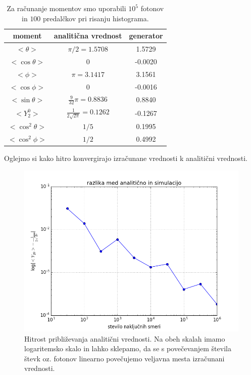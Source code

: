 \documentclass[slovene,11pt,a4paper]{article}
\numberwithin{equation}{section} %
\numberwithin{figure}{section} %
\numberwithin{table}{section} %
\begin{document}
\begin{table}[h]
\begin{center}
\begin{tabular}{|c|c|c|}
\hline
moment & analitična vrednost & generator \\ \hline
$<\theta>$ & $\pi /2=1.5708$ & 1.5729 \\ \hline
$<\cos\theta>$ & $0$ & -0.0020 \\ \hline
$<\phi>$ & $\pi=3.1417$ & 3.1561 \\ \hline
$<\cos \phi>$ & $0$ & -0.0016 \\ \hline
$<\sin \theta>$ & $\frac{9}{32} \pi=0.8836$ & 0.8840 \\ \hline
$<Y_2^0>$ & $\frac{1}{2\sqrt{2 \pi}}=0.1262$ & -0.1267 \\ \hline
$<\cos^2 \theta>$ & $1/5$ & 0.1995 \\ \hline
$<\cos^2 \phi>$ & $1/2$ & 0.4992 \\ \hline
\end{tabular}
\label{}
\caption{Za računanje momentov smo uporabili $10^{5}$ fotonov in $100$ predalčkov pri risanju histograma.}
\end{center}
\end{table}
Oglejmo si kako hitro konvergirajo izračunane vrednosti k analitični vrednosti.

\begin{figure}[h]
\begin{center}
\includegraphics[scale=0.4]{slike/hitrost_variacije.png}
\end{center}
\caption{Hitrost približevanja analitični vrednosti. Na obeh skalah imamo logaritemsko skalo in lahko sklepamo, da se s povečevanjem števila števk oz. fotonov linearno povečujemo veljavna mesta izračunani vrednosti. }
\end{figure}
\end{document}
